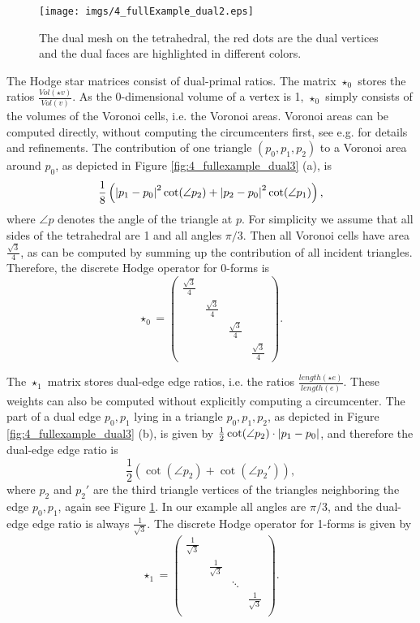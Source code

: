 \begin{figure}%
\begin{center}
\texttt{[image: imgs/4\_fullExample\_dual2.eps]}%
\end{center}
\caption{The dual mesh on the tetrahedral, the red dots are the dual vertices and the dual faces are highlighted in different colors.}%
\label{fig:4_fullexample_dual}%
\end{figure}

The Hodge star matrices consist of dual-primal ratios. The matrix $\star_0$ stores the ratios $\frac{Vol (\star v)}{Vol (v)}$. As the 0-dimensional volume of a vertex is 1, $\star_0$ simply consists of the volumes of the Voronoi cells, i.e. the Voronoi areas. Voronoi areas can be computed directly, without computing the circumcenters first, see e.g. \cite{laplacebeltrami} for details and refinements. The contribution of one triangle $(p_0, p_1, p_2)$ to a Voronoi area around $p_0$, as depicted in Figure \ref{fig:4_fullexample_dual3} (a), is
\[\frac{1}{8}\left(\left| p_1-p_0 \right|^2 \cot(\angle p_2) +  \left| p_2 - p_0 \right|^2 \cot(\angle p_1)\right),\]
where $\angle p$ denotes the angle of the triangle at $p$. For simplicity we assume that all sides of the tetrahedral are 1 and all angles $\pi /3$. Then all Voronoi cells have area $\frac{\sqrt{3}}{4}$, as can be computed by summing up the contribution of all incident triangles. Therefore, the discrete Hodge operator for 0-forms is
\[\star_0 = \begin{pmatrix}
	\frac{\sqrt{3}}{4} & & & \\
	& \frac{\sqrt{3}}{4}  & & \\
	& & \frac{\sqrt{3}}{4} & \\
	& & & \frac{\sqrt{3}}{4} 
\end{pmatrix}.\]

The $\star_1$ matrix stores dual-edge edge ratios, i.e. the ratios $\frac{length(\star e)}{length(e)}$. These weights can also be computed without explicitly computing a circumcenter. The part of a dual edge $p_0, p_1$ lying in a triangle $p_0, p_1, p_2$, as depicted in Figure \ref{fig:4_fullexample_dual3} (b), is given by $\frac{1}{2}\cot(\angle p_2) \cdot \left| p_1 - p_0 \right|$, and therefore the dual-edge edge ratio is 
\[\frac{1}{2} \left( \cot(\angle p_2) + \cot (\angle p_2') \right ),\]
where $p_2$ and $p_2'$ are the third triangle vertices of the triangles neighboring the edge $p_0, p_1$, again see Figure \ref{fig:4_fullexample_dual}. In our example all angles are $ \pi/3$, and the dual-edge edge ratio is always $\frac{1}{\sqrt{3}}$. The discrete Hodge operator for 1-forms is given by
\[\star_1 = \begin{pmatrix}
	\frac{1}{\sqrt{3} }& & & \\
	 & \frac{1}{\sqrt{3}} & & \\
	 & & \ddots & \\
	 
	 & & & 	\frac{1}{\sqrt{3} } \\
\end{pmatrix}.\]

